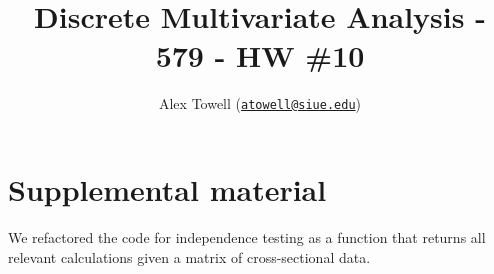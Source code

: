 \documentclass[
]{article}
\title{Discrete Multivariate Analysis - 579 - HW \#10}
\author{Alex Towell
(\href{mailto:atowell@siue.edu}{\nolinkurl{atowell@siue.edu}})}
\date{}
\begin{document}
\maketitle

\newcommand{\var}{\operatorname{Var}}
\newcommand{\expect}{\operatorname{E}}
\newcommand{\corr}{\operatorname{Corr}}
\newcommand{\cov}{\operatorname{Cov}}
\newcommand{\ssr}{\operatorname{SSR}}
\newcommand{\se}{\operatorname{SE}}
\newcommand{\mat}[1]{\mathbf{#1}}
\newcommand{\RR}{\operatorname{RR}}
\newcommand{\eval}[2]{\left. #1 \right\vert_{#2}}

\hypertarget{supplemental-material}{%
\section{Supplemental material}\label{supplemental-material}}

We refactored the code for independence testing as a function that
returns all relevant calculations given a matrix of cross-sectional
data.
\end{document}
